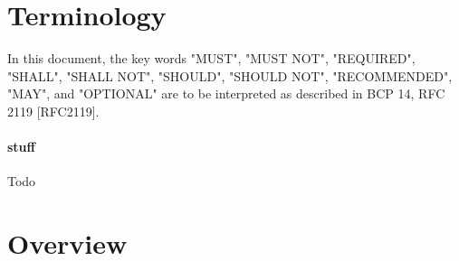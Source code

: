 \documentclass[10pt]{article}
\begin{document}
\section{Terminology}{
	In this document, the key words "MUST", "MUST NOT", "REQUIRED",
	"SHALL", "SHALL NOT", "SHOULD", "SHOULD NOT", "RECOMMENDED", "MAY",
	and "OPTIONAL" are to be interpreted as described in BCP 14, RFC 2119   [RFC2119].
	
	\paragraph{stuff} Todo
}
\pagebreak

\section{Overview}{
	\lipsum[4]
}
\end{document}
